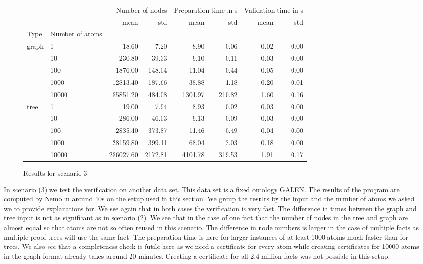 \begin{figure}
    \centering
    \begin{tabular}{llrrrrrr}
        &  & \multicolumn{2}{r}{Number of nodes} & \multicolumn{2}{r}{Preparation time in s} & \multicolumn{2}{r}{Validation time in s} \\
        &  & mean & std & mean & std & mean & std \\
       Type & Number of atoms &  &  &  &  &  &  \\
       \multirow[c]{5}{*}{graph} & 1 & 18.60 & 7.20 & 8.90 & 0.06 & 0.02 & 0.00 \\
        & 10 & 230.80 & 39.33 & 9.10 & 0.11 & 0.03 & 0.00 \\
        & 100 & 1876.00 & 148.04 & 11.04 & 0.44 & 0.05 & 0.00 \\
        & 1000 & 12813.40 & 187.66 & 38.88 & 1.18 & 0.20 & 0.01 \\
        & 10000 & 85851.20 & 484.08 & 1301.97 & 210.82 & 1.60 & 0.16 \\
       \multirow[c]{5}{*}{tree} & 1 & 19.00 & 7.94 & 8.93 & 0.02 & 0.03 & 0.00 \\
        & 10 & 286.00 & 46.03 & 9.13 & 0.09 & 0.03 & 0.00 \\
        & 100 & 2835.40 & 373.87 & 11.46 & 0.49 & 0.04 & 0.00 \\
        & 1000 & 28159.80 & 399.11 & 68.04 & 3.03 & 0.18 & 0.00 \\
        & 10000 & 286027.60 & 2172.81 & 4101.78 & 319.53 & 1.91 & 0.17 \\
       \end{tabular}
       
       \caption{Results for scenario 3}
       \label{res:scenario3}
\end{figure}
In scenario (3) we test the verification on another data set. This data set is a fixed ontology GALEN. The results of the program are computed by Nemo in around 10s on the setup used in this section. We group the results by the input and the number of atoms we asked we to provide explanations for. We see again that in both cases the verification is very fast. The difference in times between the graph and tree input is not as significant as in scenario (2). We see that in the case of one fact that the number of nodes in the tree and graph are almost equal so that atoms are not so often reused in this scenario. The difference in node numbers is larger in the case of multiple facts as multiple proof trees will use the same fact. The preparation time is here for larger instances of at least 1000 atoms much faster than for trees. We also see that a completeness check is futile here as we need a certificate for every atom while creating certificates for 10000 atoms in the graph format already takes around 20 minutes. Creating a certificate for all 2.4 million facts was not possible in this setup. 


